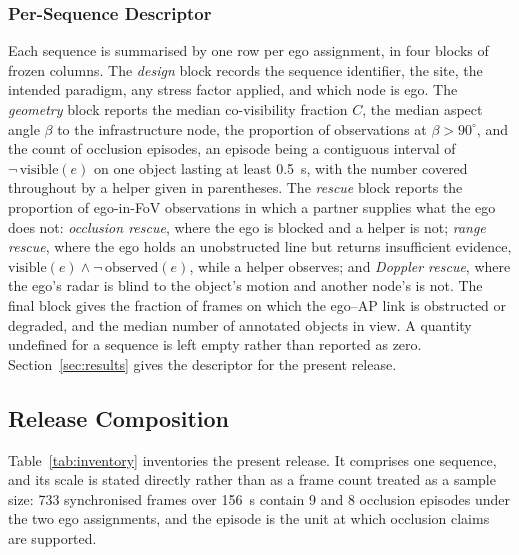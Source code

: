 \subsubsection{Per-Sequence Descriptor}
\label{sec:descriptor}
Each sequence is summarised by one row per ego assignment, in four blocks of
frozen columns. The \textit{design} block records the sequence identifier, the
site, the intended paradigm, any stress factor applied, and which node is ego.
The \textit{geometry} block reports the median co-visibility fraction $C$, the
median aspect angle $\beta$ to the infrastructure node, the proportion of
observations at $\beta > 90^\circ$, and the count of occlusion episodes, an
episode being a contiguous interval of $\neg\,\mathrm{visible}(e)$ on one object
lasting at least \SI{0.5}{\second}, with the number covered throughout by a
helper given in parentheses. The \textit{rescue} block reports the proportion of
ego-in-FoV observations in which a partner supplies what the ego does not:
\textit{occlusion rescue}, where the ego is blocked and a helper is not;
\textit{range rescue}, where the ego holds an unobstructed line but returns
insufficient evidence, $\mathrm{visible}(e) \wedge \neg\,\mathrm{observed}(e)$,
while a helper observes; and \textit{Doppler rescue}, where the ego's radar is
blind to the object's motion and another node's is not. The final block gives
the fraction of frames on which the ego--AP link is obstructed or degraded, and
the median number of annotated objects in view. A quantity undefined for a
sequence is left empty rather than reported as zero. Section~\ref{sec:results}
gives the descriptor for the present release.

\subsection{Release Composition}
\label{sec:conditions}

Table~\ref{tab:inventory} inventories the present release. It comprises one
sequence, and its scale is stated directly rather than as a frame count treated
as a sample size: \num{733} synchronised frames over \SI{156}{\second} contain
\num{9} and \num{8} occlusion episodes under the two ego assignments, and the
episode is the unit at which occlusion claims are supported.

